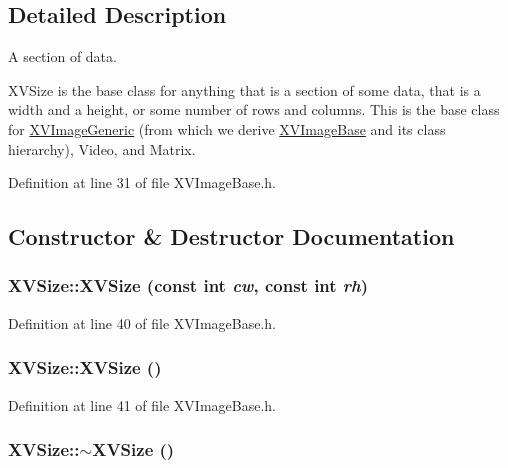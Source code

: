 \subsection{Detailed Description}
A section of data.

XVSize is the base class for anything that is  a section of some data, that is a width and a height, or some number of rows and columns. This is the base class for \hyperlink{class_XVImageGeneric}{XVImage\-Generic} (from which we derive \hyperlink{class_XVImageBase}{XVImage\-Base} and its class hierarchy), Video, and Matrix. 



Definition at line 31 of file XVImage\-Base.h.

\subsection{Constructor \& Destructor Documentation}
\label{XVSize_a0}
\hypertarget{class_XVSize_a0}{
\subsubsection[XVSize]{\setlength{\rightskip}{0pt plus 5cm}XVSize::XVSize (const int {\em cw}, const int {\em rh})}}




Definition at line 40 of file XVImage\-Base.h.\label{XVSize_a1}
\hypertarget{class_XVSize_a1}{
\subsubsection[XVSize]{\setlength{\rightskip}{0pt plus 5cm}XVSize::XVSize ()}}




Definition at line 41 of file XVImage\-Base.h.\label{XVSize_a2}
\hypertarget{class_XVSize_a2}{
\subsubsection[~XVSize]{\setlength{\rightskip}{0pt plus 5cm}XVSize::$\sim$XVSize ()}}




